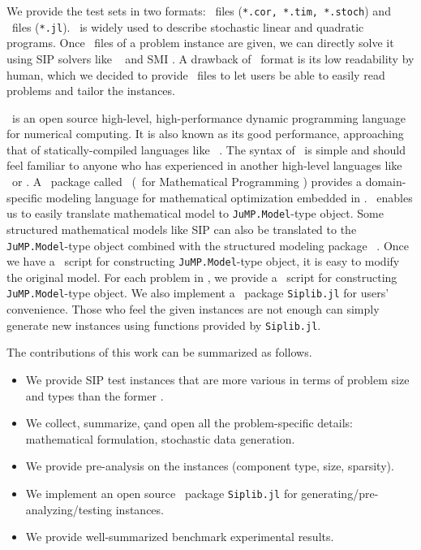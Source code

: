 We provide the test sets in two formats: \smps\ files (\texttt{*.cor, *.tim, *.stoch}) and \julia\ files (\texttt{*.jl}). \smps\ is widely used to describe stochastic linear and quadratic programs. Once \smps\ files of a problem instance are given, we can directly solve it using SIP solvers like \dsp\ \cite{journal:KZ2015} and \textsf{SMI} \cite{web:SMI}. A drawback of \smps\ format is its low readability by human, which we decided to provide \julia\ files to let users be able to easily read problems and tailor the instances.

\julia\ is an open source high-level, high-performance dynamic programming language for numerical computing. It is also known as its good performance, approaching that of statically-compiled languages like \clang\ \cite{journal:BEKS2017}. The syntax of \julia\ is simple and should feel familiar to anyone who has experienced in another high-level languages like \matlab\ or \python. A \julia\ package called \jump\ (\julia\ for Mathematical Programming \cite{web:JuMP}) provides a domain-specific modeling language for mathematical optimization embedded in \julia. \jump\ enables us to easily translate mathematical model to \texttt{JuMP.Model}-type object. Some structured mathematical models like SIP can also be translated to the \texttt{JuMP.Model}-type object combined with the structured modeling package \structjump\ \cite{web:StructJuMP}. Once we have a \julia\ script for constructing \texttt{JuMP.Model}-type object, it is easy to modify the original model. For each problem in \siplibtwo, we provide a \julia\ script for constructing \texttt{JuMP.Model}-type object. We also implement a \julia\ package \texttt{Siplib.jl} for users' convenience. Those who feel the given instances are not enough can simply generate new instances using functions provided by \texttt{Siplib.jl}.

The contributions of this work can be summarized as follows.
\begin{itemize}
	\item We provide SIP test instances that are more various in terms of problem size and types than the former \siplib.
	\item We collect, summarize, çand open all the problem-specific details: mathematical formulation, stochastic data generation.
	\item We provide pre-analysis on the instances (component type, size, sparsity).
	\item We implement an open source \julia\ package \texttt{Siplib.jl} for generating/pre-analyzing/testing instances.
	\item We provide well-summarized benchmark experimental results.
\end{itemize}


